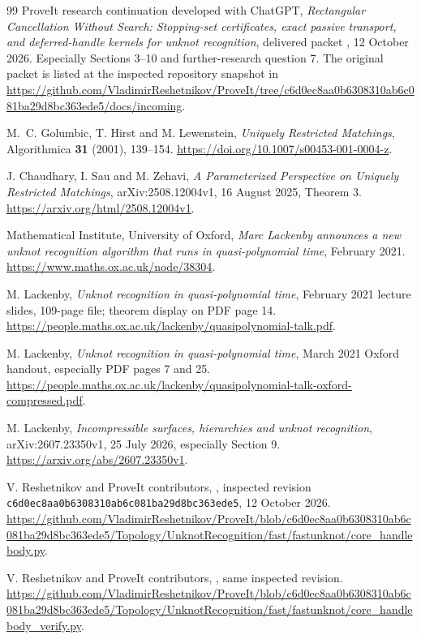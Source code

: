 \documentclass[11pt]{article}
\theoremstyle{definition}\newtheorem{definition}[theorem]{Definition}
\theoremstyle{remark}\newtheorem{remark}[theorem]{Remark}
\newcommand{\pin}{\texttt{c6d0ec8aa0b6308310ab6c081ba29d8bc363ede5}}
\begin{document}
\begin{thebibliography}{99}
\small
{}
ProveIt research continuation developed with ChatGPT,
\emph{Rectangular Cancellation Without Search: Stopping-set certificates, exact passive transport, and deferred-handle kernels for unknot recognition},
delivered packet , 12 October 2026. Especially Sections 3--10 and further-research question 7. The original packet is listed at the inspected repository snapshot in
\url{https://github.com/VladimirReshetnikov/ProveIt/tree/c6d0ec8aa0b6308310ab6c081ba29d8bc363ede5/docs/incoming}.

M.~C. Golumbic, T. Hirst and M. Lewenstein,
\emph{Uniquely Restricted Matchings}, Algorithmica \textbf{31} (2001), 139--154.
\url{https://doi.org/10.1007/s00453-001-0004-z}.

J. Chaudhary, I. Sau and M. Zehavi,
\emph{A Parameterized Perspective on Uniquely Restricted Matchings},
arXiv:2508.12004v1, 16 August 2025, Theorem 3.
\url{https://arxiv.org/html/2508.12004v1}.

Mathematical Institute, University of Oxford,
\emph{Marc Lackenby announces a new unknot recognition algorithm that runs in quasi-polynomial time}, February 2021.
\url{https://www.maths.ox.ac.uk/node/38304}.

M. Lackenby,
\emph{Unknot recognition in quasi-polynomial time}, February 2021 lecture slides, 109-page file; theorem display on PDF page 14.
\url{https://people.maths.ox.ac.uk/lackenby/quasipolynomial-talk.pdf}.

M. Lackenby,
\emph{Unknot recognition in quasi-polynomial time}, March 2021 Oxford handout, especially PDF pages 7 and 25.
\url{https://people.maths.ox.ac.uk/lackenby/quasipolynomial-talk-oxford-compressed.pdf}.

M. Lackenby,
\emph{Incompressible surfaces, hierarchies and unknot recognition},
arXiv:2607.23350v1, 25 July 2026, especially Section 9.
\url{https://arxiv.org/abs/2607.23350v1}.

V. Reshetnikov and ProveIt contributors,
,
inspected revision \pin, 12 October 2026.
\url{https://github.com/VladimirReshetnikov/ProveIt/blob/c6d0ec8aa0b6308310ab6c081ba29d8bc363ede5/Topology/UnknotRecognition/fast/fastunknot/core_handlebody.py}.

V. Reshetnikov and ProveIt contributors,
,
same inspected revision.
\url{https://github.com/VladimirReshetnikov/ProveIt/blob/c6d0ec8aa0b6308310ab6c081ba29d8bc363ede5/Topology/UnknotRecognition/fast/fastunknot/core_handlebody_verify.py}.


\end{thebibliography}
\end{document}
